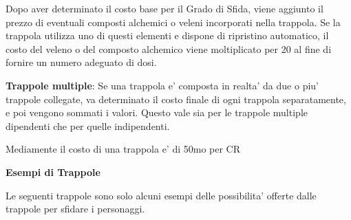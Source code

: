 \documentclass[a4paper,11pt,twoside,openany]{book}
\begin{document}
Dopo aver determinato il costo base per il Grado di Sfida, viene aggiunto il prezzo di eventuali composti alchemici o veleni incorporati nella trappola. Se la trappola utilizza uno di questi elementi e dispone di ripristino automatico, il costo del veleno o del composto alchemico viene moltiplicato per 20 al fine di fornire un numero adeguato di dosi.

\textbf{Trappole multiple}: Se una trappola e' composta in realta' da due o piu' trappole collegate, va determinato il costo finale di ogni trappola separatamente, e poi vengono sommati i valori. Questo vale sia per le trappole multiple dipendenti che per quelle indipendenti.

Mediamente il costo di una trappola e' di 50mo per CR

\pagebreak

\textbf{Esempi di Trappole}

Le seguenti trappole sono solo alcuni esempi delle possibilita' offerte
dalle trappole per sfidare i personaggi.
\end{document}
